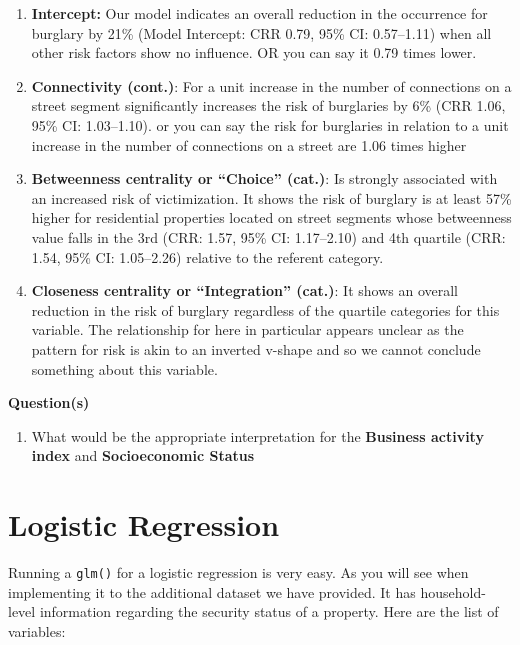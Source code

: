 \documentclass[
]{book}
\providecommand{\tightlist}{%
  \setlength{\itemsep}{0pt}\setlength{\parskip}{0pt}}
\begin{document}
\begin{enumerate}
\def\labelenumi{\arabic{enumi}.}
\item
  \textbf{Intercept:} Our model indicates an overall reduction in the occurrence for burglary by 21\% (Model Intercept: CRR 0.79, 95\% CI: 0.57--1.11) when all other risk factors show no influence. OR you can say it 0.79 times lower.
\item
  \textbf{Connectivity (cont.)}: For a unit increase in the number of connections on a street segment significantly increases the risk of burglaries by 6\% (CRR 1.06, 95\% CI: 1.03--1.10). or you can say the risk for burglaries in relation to a unit increase in the number of connections on a street are 1.06 times higher
\item
  \textbf{Betweenness centrality or ``Choice'' (cat.)}: Is strongly associated with an increased risk of victimization. It shows the risk of burglary is at least 57\% higher for residential properties located on street segments whose betweenness value falls in the 3rd (CRR: 1.57, 95\% CI: 1.17--2.10) and 4th quartile (CRR: 1.54, 95\% CI: 1.05--2.26) relative to the referent category.
\item
  \textbf{Closeness centrality or ``Integration'' (cat.)}: It shows an overall reduction in the risk of burglary regardless of the quartile categories for this variable. The relationship for here in particular appears unclear as the pattern for risk is akin to an inverted v-shape and so we cannot conclude something about this variable.
\end{enumerate}

\textbf{Question(s)}

\begin{enumerate}
\def\labelenumi{\arabic{enumi}.}
\tightlist
\item
  What would be the appropriate interpretation for the \textbf{Business activity index} and \textbf{Socioeconomic Status}
\end{enumerate}

\hypertarget{logistic-regression}{%
\section{Logistic Regression}\label{logistic-regression}}

Running a \texttt{glm()} for a logistic regression is very easy. As you will see when implementing it to the additional dataset we have provided. It has household-level information regarding the security status of a property. Here are the list of variables:
\end{document}
